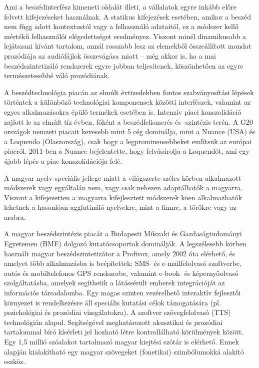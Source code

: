 \begin{multicols}{2}
Ami a beszédinterfész kimeneti oldalát illeti, a vállalatok egyre inkább előre felvett kifejezéseket használnak. A statikus kifejezések esetében, amikor a beszéd nem függ adott kontextustól vagy a felhasználó adataitól, ez a módszer kellő mértékű felhasználói elégedettséget eredményez. Viszont minél dinamikusabb a lejátszani kívánt tartalom, annál rosszabb lesz az ele\-mek\-ből összeállított mondat prozódiája az audiófájlok összevágása miatt -- még akkor is, ha a mai beszédszintetizáló rendszerek egyre jobban teljesítenek, köszönhetően az egyre természetesebbé váló prozódiának. 

A beszédtechnológia piacán az elmúlt évtizedekben fontos szabványosítási lépések történtek a különböző technológiai komponensek közötti interfészek, valamint az egyes alkalmazásokra épülő termékek ese\-té\-ben is. Intenzív piaci konszolidáció zajlott le az elmúlt tíz évben, főként a beszédfelismerés és -szintézis terén. A G20 országok nemzeti piacait kevesebb mint 5 cég dominálja, mint a Nuance (USA) és a Loquendo (Olaszország), csak hogy a legprominensebbeket említsük az európai piacról. 2011-ben a Nuance bejelentette, hogy felvásárolja a Loquendót, ami egy újabb lépés a piac konszolidációja felé. 

A magyar nyelv speciális jellege miatt a világszerte széles körben alkalmazott módszerek vagy egyáltalán nem, vagy csak nehezen adaptálhatók a magyarra. Vi\-szont a kifejezetten a magyarra ki\-fej\-lesz\-tett módszerek köen alkalmazhatók lehetnek a hasonlóan agglutináló nyel\-vek\-re, mint a finnre, a törökre vagy az arabra. 

A magyar beszédszintézis piacát a Budapesti Műszaki és Gazdaságtudományi Egyetemen (BME) dolgozó kutatócsoportok \cite{bme} dominálják. A legszélesebb körben használt magyar beszédszintetizátor a Profivox, amely 2002 óta elérhető, és amelyet több alkalmazásba is beépítettek: SMS- és e-mailfelolvasó szoftverbe, autós és mobiltelefonos GPS rendszerbe, valamint e-book- és képernyőolvasó szolgáltatásba, amelyek segíthetik a látássérült emberek integrációját az információs társadalomba. Egy magas szinten vezérelhető interaktív fejlesztői környezet is rendelkezésre áll speciális kutatási célok támogatására (pl. pszichológiai és prozódiai vizsgálatokra). A szoftver szövegfelolvasó (TTS) technológián alapul. Segítségével meghatározott akusztikai és prozódiai tartalommal bíró kísérleti jel hozható létre kont\-rol\-lál\-ha\-tó körülmények között. Egy 1,5 millió szóalakot tartalmazó magyar kiejtési szótár is elérhető. Ennek alapján ki\-ala\-kít\-ha\-tó egy magyar szövegeket (fonetikai) szimbólumokká alakító eszköz. 


\end{multicols}
